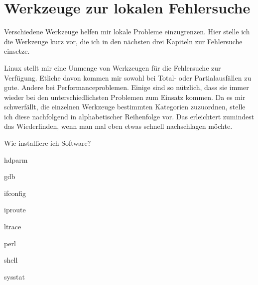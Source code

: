 \chapter{Werkzeuge zur lokalen Fehlersuche}
\label{cha:lokal-werkzeuge}

\begin{abstractsec}
  Verschiedene Werkzeuge helfen mir lokale Probleme einzugrenzen. Hier stelle
  ich die Werkzeuge kurz vor, die ich in den nächsten drei Kapiteln zur
  Fehlersuche einsetze.
\end{abstractsec}

\begin{normaltext}
  Linux stellt mir eine Unmenge von Werkzeugen für die Fehlersuche zur
  Verfügung. Etliche davon kommen mir sowohl bei Total- oder Partialausfällen
  zu gute. Andere bei Performanceproblemen. Einige sind so nützlich, dass sie
  immer wieder bei den unterschiedlichsten Problemen zum Einsatz kommen. Da
  es mir schwerfällt, die einzelnen Werkzeuge bestimmten Kategorien
  zuzuordnen, stelle ich diese nachfolgend in alphabetischer Reihenfolge vor.
  Das erleichtert zumindest das Wiederfinden, wenn man mal eben etwas schnell
  nachschlagen möchte.
\end{normaltext}

\begin{notes}
\item Wie installiere ich Software?
\item hdparm
\item gdb
\item ifconfig
\item iproute
\item ltrace
\item perl
\item shell
\item sysstat
\end{notes}

